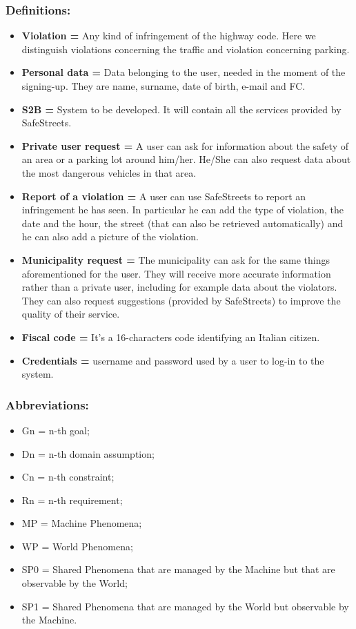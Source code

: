 \documentclass[titlepage]{article}
\begin{document}
\subsubsection{Definitions:}
\begin{itemize}
	\item \textbf{Violation =} Any kind of infringement of the highway code. Here we distinguish violations concerning the traffic and violation concerning parking.\\
	\item \textbf{Personal data =} Data belonging to the user, needed in the moment of the signing-up. They are name, surname, date of birth, e-mail and FC.
	\item \textbf{S2B =} System to be developed. It will contain all the services provided by SafeStreets.
	\item \textbf{Private user request =} A user can ask for information about the safety of an area or a parking lot around him/her. He/She can also request data about the most dangerous vehicles in that area.
	\item \textbf{Report of a violation =} A user can use SafeStreets to report an infringement he has seen. In particular he can add the type of violation, the date and the hour, the street (that can also be retrieved automatically) and he can also add a picture of the violation.
	\item \textbf{Municipality request =} The municipality can ask for the same things aforementioned for the user. They will receive more accurate information rather than a private user, including for example data about the violators. They can also request suggestions (provided by SafeStreets) to improve the quality of their service.
	\item \textbf{Fiscal code =} It's a 16-characters code identifying an Italian citizen.
	\item \textbf{Credentials =} username and password used by a user to log-in to the system.
	
\end{itemize}
\subsubsection{Abbreviations:}

\begin{itemize}

	\item Gn = n-th goal;
	\item Dn = n-th domain assumption;
	\item Cn = n-th constraint;
	\item Rn = n-th requirement;
	\item MP = Machine Phenomena;
	\item WP = World Phenomena;
	\item SP0 = Shared Phenomena that are managed by the Machine but that are observable by the World;
	\item SP1 = Shared Phenomena that are managed by the World but observable by the Machine.

\end{itemize}
\end{document}
